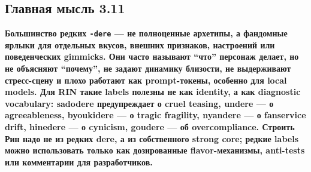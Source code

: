 \subsection*{Главная мысль 3.11}

\textbf{Большинство редких \texttt{-dere} --- не полноценные архетипы, а
фандомные ярлыки для отдельных вкусов, внешних признаков, настроений или
поведенческих gimmicks. Они часто называют ``что'' персонаж делает, но
не объясняют ``почему'', не задают динамику близости, не выдерживают
стресс-сцену и плохо работают как prompt-токены, особенно для local
models. Для RIN такие labels полезны не как identity, а как diagnostic
vocabulary: sadodere предупреждает о cruel teasing, undere --- о
agreeableness, byoukidere --- о tragic fragility, nyandere --- о
fanservice drift, hinedere --- о cynicism, goudere --- об
overcompliance. Строить Рин надо не из редких dere, а из собственного
strong core; редкие labels можно использовать только как дозированные
flavor-механизмы, anti-tests или комментарии для разработчиков.}
